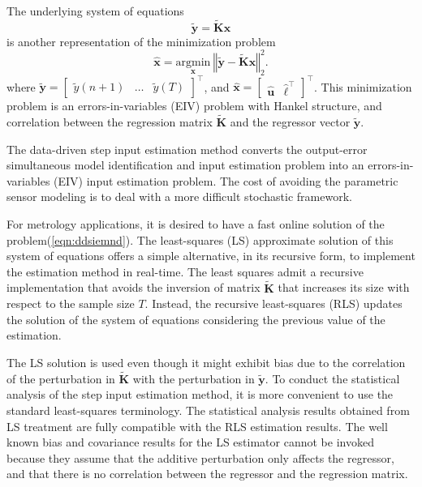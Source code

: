 The underlying system of equations 
\begin{equation} \widetilde{\mathbf{y}} = \widetilde{\mathbf{K}} \mathbf{x} \label{eqn:ddsiemnd} \end{equation}
is another representation of the minimization problem
\begin{equation} \widehat{\mathbf{x}} = \underset{\mathbf{x}}{\mathrm{argmin}} \ \left\Vert  \widetilde{\mathbf{y}} - \widetilde{\mathbf{K}} \mathbf{x} \right\Vert^2_2 . \label{eqn:min_seiv} \end{equation}
where $\widetilde{\mathbf{y}} = \begin{bmatrix} \widetilde{y}(n+1) & \ldots & \widetilde{y}(T) \end{bmatrix}^\top$, and
$\widehat{\mathbf{x}} = \begin{bmatrix} \widehat{\mathbf{u}} & \widehat{\bm{\ell}}^\top \end{bmatrix}^\top$. 
This minimization problem is an errors-in-variables (EIV) problem with Hankel structure, and correlation between the regression matrix $\widetilde{\mathbf{K}}$ and the regressor vector $\widetilde{\mathbf{y}}$.

The data-driven step input estimation method converts the output-error simultaneous model identification and input estimation problem into an errors-in-variables (EIV) input estimation problem.
The cost of avoiding the parametric sensor modeling is to deal with a more difficult stochastic framework.

For metrology applications, it is desired to have a fast online solution of the problem(\ref{eqn:ddsiemnd}).
The least-squares (LS) approximate solution of this system of equations offers a simple alternative, in its recursive form, to implement the estimation method in real-time.
The least squares admit a recursive implementation that avoids the inversion of matrix $\widetilde{\mathbf{K}}$ that increases its size with respect to the sample size $T$.
Instead, the recursive least-squares (RLS) updates the solution of the system of equations considering the previous value of the estimation.

The LS solution is used even though it might exhibit bias due to the correlation of the perturbation in $\widetilde{\mathbf{K}}$ with the perturbation in $\widetilde{\mathbf{y}}$.
To conduct the statistical analysis of the step input estimation method, it is more convenient to use the standard least-squares terminology.
The statistical analysis results obtained from LS treatment are fully compatible with the RLS estimation results.
The well known bias and covariance results for the LS estimator cannot be invoked because they assume that the additive perturbation only affects the regressor, and that there is no correlation between the regressor and the regression matrix.






